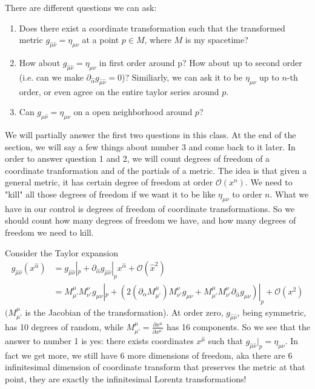 \documentclass[10pt]{article}
\newcommand{\xm}{x^\mu}
\newcommand{\xmp}{x^{\mu'}}
\newcommand{\gmn}{g_{\mu \nu}}
\newcommand{\gmnhat}{g_{\hat{\mu} \hat{\nu}}}
\newcommand{\emn}{\eta_{\mu \nu}}
\begin{document}
There are different questions we can ask:

\begin{enumerate}

\item Does there exist a coordinate transformation such that the transformed metric $\gmnhat = \emn$ at a point $p \in M$, where $M$ is my spacetime?

\item How about $\gmnhat = \emn$ in first order around p? How about up to second order (i.e. can we make $\partial_{\hat{\alpha}} \gmnhat = 0$)? Similiarly, we can ask it to be $\emn$ up to $n$-th order, or even agree on the entire taylor series around $p$.

\item Can $\gmnhat= \emn$ on a open neighborhood around $p$?

\end{enumerate}

We will partially answer the first two questions in this class. At the end of the section, we will say a few things about number 3 and come back to it later. In order to answer question 1 and 2, we will count degrees of freedom of a coordinate tranformation and of the partials of a metric. The idea is that given a general metric, it has certain degree of freedom at order $\mathcal{O}(x^n)$. We need to "kill" all those degrees of freedom if we want it to be like $\emn$ to order $n$. What we have in our control is degrees of freedom of coordinate transformations. So we should count how many degrees of freedom we have, and how many degrees of freedom we need to kill.

Consider the Taylor expansion
\begin{align*}
\gmnhat (x^{\hat{\alpha}}) & = \gmnhat|_p + \partial_{\hat{\alpha}} \gmnhat|_p x^{\hat{\alpha}} + \mathcal{O}(\hat{x}^2)
\\ &= M^{\mu}_{\mu'} M^{\nu}_{\nu'} \gmn|_p + (2 (\partial_{\alpha} M^{\mu}_{\mu'}) M^{\nu}_{\nu'} \gmn + M^{\mu}_{\mu'} M^{\nu}_{\nu'} \partial_{\hat{\alpha}} \gmn)|_p + \mathcal{O}(x^2)
\end{align*}
$ (M^{\mu}_{\mu'}$ is the Jacobian of the transformation). At order zero, $\gmnhat$, being symmetric, has 10 degrees of random, while $M^\mu _{\mu'} = \frac {\partial \xm}{\partial \xmp}$ has 16 components. So we see that the answer to number 1 is yes: there exists coordinates $x^{\hat{\mu}}$ such that $\gmnhat|_p  = \emn$. In fact we get more, we still have 6 more dimensions of freedom, aka there are 6 infinitesimal dimension of coordinate transform that preserves the metric at that point, they are exactly the infinitesimal Lorentz transformations!
\end{document}
